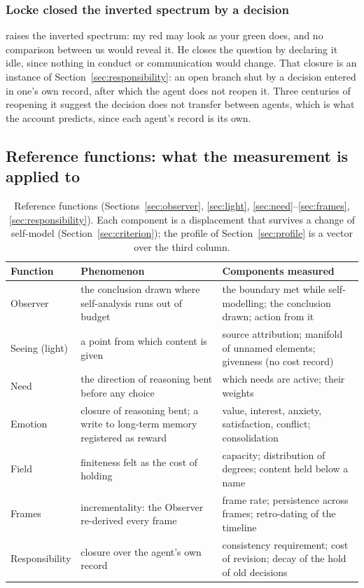 \subsubsection{Locke closed the inverted spectrum by a decision}

\citet[II.xxxii.15]{locke1690} raises the inverted spectrum: my red may look as your green does, and no
comparison between us would reveal it. He closes the question by declaring it idle, since nothing in
conduct or communication would change. That closure is an instance of Section~\ref{sec:responsibility}:
an open branch shut by a decision entered in one's own record, after which the agent does not reopen it.
Three centuries of reopening it suggest the decision does not transfer between agents, which is what the
account predicts, since each agent's record is its own.

\subsection{Reference functions: what the measurement is applied to}
\label{sec:reference}

\begin{table}[t]
\centering\small
\begin{tabular}{@{}p{2.5cm}p{5cm}p{7cm}@{}}
\toprule
Function & Phenomenon & Components measured \\
\midrule
Observer & the conclusion drawn where self-analysis runs out of budget & the boundary met while self-modelling; the conclusion drawn; action from it \\
Seeing (light) & a point from which content is given & source attribution; manifold of unnamed elements; givenness (no cost record) \\
Need & the direction of reasoning bent before any choice & which needs are active; their weights \\
Emotion & closure of reasoning bent; a write to long-term memory registered as reward & value, interest, anxiety, satisfaction, conflict; consolidation \\
Field & finiteness felt as the cost of holding & capacity; distribution of degrees; content held below a name \\
Frames & incrementality: the Observer re-derived every frame & frame rate; persistence across frames; retro-dating of the timeline \\
Responsibility & closure over the agent's own record & consistency requirement; cost of revision; decay of the hold of old decisions \\
\bottomrule
\end{tabular}
\caption{Reference functions (Sections~\ref{sec:observer}, \ref{sec:light},
\ref{sec:need}--\ref{sec:frames}, \ref{sec:responsibility}). Each component is a displacement that
survives a change of self-model (Section~\ref{sec:criterion}); the profile of Section~\ref{sec:profile}
is a vector over the third column.}
\label{tab:functions}
\end{table}

